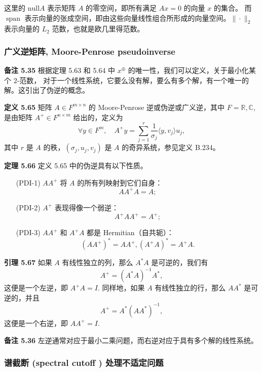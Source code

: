 \documentclass[a4paper]{ctexart}
\begin{document}
{这里的  $\mathrm{null} A $ 表示矩阵 \( A \) 的零空间，即所有满足 \( Ax = 0 \) 的向量 \( x \) 的集合。
而 \( \operatorname{span} \) 表示向量的张成空间，即由这些向量线性组合所形成的向量空间。\( \| \cdot \|_2 \) 表示向量的 \( L_2 \) 范数，也就是欧几里得范数。

\subsubsection{广义逆矩阵, Moore-Penrose pseudoinverse}

\noindent \textbf{备注 5.35 } 根据定理 5.63 和 5.64 中 \(x^{\oplus}\) 的唯一性，我们可以定义，关于最小化某个 $2$-范数，
对于一个线性系统，它要么没有解，要么有多个解，有一个唯一的解。这引出了伪逆的概念。

\noindent \textbf{定义 5.65 } 矩阵 \(A \in F^{m \times n}\) 的 Moore-Penrose 逆或伪逆或广义逆，其中 \(F = \mathbb{R}, \mathbb{C}\), 
是由矩阵 \(A^{+} \in F^{n \times m}\) 给出的，定义为
\[
  \forall y \in F^{m}, \quad A^{+} y = \sum_{j=1}^{r} \frac{1}{\sigma_{j}} \langle y, v_{j} \rangle u_{j}, \tag{5.62}
\]
其中 \(r\) 是 \(A\) 的秩，\((\sigma_{j}, u_{j}, v_{j})\) 是 \(A\) 的奇异系统，参见定义 B.234。

\noindent \textbf{定理 5.66 } 定义 5.65 中的伪逆具有以下性质。

\begin{itemize}
  \item[(PDI-1)] \(AA^{+}\) 将 \(A\) 的所有列映射到它们自身：
  \[
    AA^{+}A = A;
  \]
  \item[(PDI-2)] \(A^{+}\) 表现得像一个弱逆：
  \[
    A^{+}AA^{+} = A^{+};
  \]
  \item[(PDI-3)] \(AA^{+}\) 和 \(A^{+}A\) 都是 Hermitian（自共轭）：
  \[
    (AA^{+})^{*} = AA^{+}, (A^{+}A)^{*} = A^{+}A.
  \]  
\end{itemize}

\noindent \textbf{引理 5.67 } 如果 \(A\) 有线性独立的列，那么 \(A^{*}A\) 是可逆的，我们有
\[
  A^{+} = (A^{*}A)^{-1}A^{*}, \tag{5.63}
\]
这便是一个左逆，即 \(A^{+}A = I\). 同样地，如果 \(A\) 有线性独立的行，那么 \(AA^{*}\) 是可逆的，并且
\[
  A^{+} = A^{*}(AA^{*})^{-1}, \tag{5.64}
\]
这便是一个右逆，即 \(AA^{+} = I\).

\noindent \textbf{备注 5.36 } 左逆通常对应于最小二乘问题，而右逆对应于具有多个解的线性系统。

\subsubsection{谱截断 (spectral cutoff ) 处理不适定问题}

}
\end{document}
